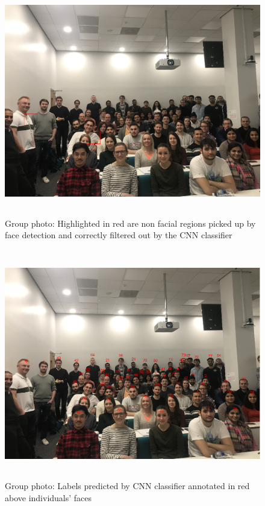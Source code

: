 \documentclass[11pt]{article}
\begin{document}
        \begin{figure}[p]
            \centering
            \includegraphics[height=10cm]{./Images/results/non_faces.png}
            \caption{Group photo: Highlighted in red are non facial regions picked up by face detection and correctly filtered out by the CNN classifier}
            \label{fig:results:non_faces}
        \end{figure}

        \begin{figure}[p]
            \centering
            \includegraphics[height=10cm]{./Images/results/annotated_group.png}
            \caption{Group photo: Labels predicted by CNN classifier annotated in red above individuals' faces}
            \label{fig:results:annotated_group}
        \end{figure}
\end{document}

